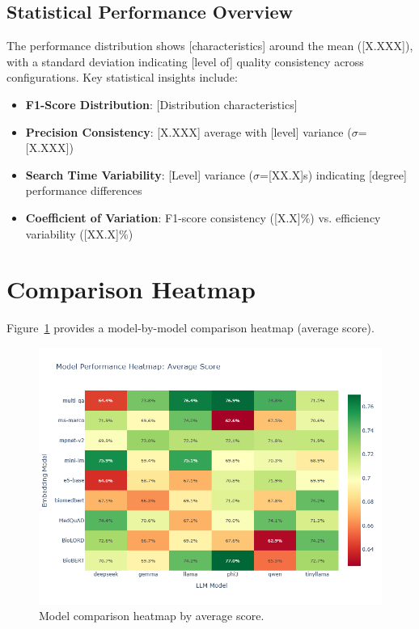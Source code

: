 \subsection{Statistical Performance Overview}


The performance distribution shows [characteristics] around the mean ([X.XXX]), with a standard deviation indicating [level of] quality consistency across configurations. Key statistical insights include:

\begin{itemize}
    \item \textbf{F1-Score Distribution}: [Distribution characteristics]
    \item \textbf{Precision Consistency}: [X.XXX] average with [level] variance ($\sigma$=[X.XXX])
    \item \textbf{Search Time Variability}: [Level] variance ($\sigma$=[XX.X]s) indicating [degree] performance differences
    \item \textbf{Coefficient of Variation}: F1-score consistency ([X.X]\%) vs. efficiency variability ([XX.X]\%)
\end{itemize}

\section{Comparison Heatmap}
Figure~\ref{fig:heatmap_avg_score} provides a model-by-model comparison heatmap (average score).

\begin{figure}[!htbp]
  \centering
  \includegraphics[width=\textwidth]{chap4_results/images/heatmap_average_score.png}
  \caption{Model comparison heatmap by average score.}
  \label{fig:heatmap_avg_score}
\end{figure}


